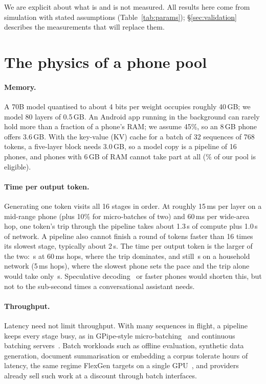 \documentclass[sigconf,nonacm]{acmart}
\begin{document}
We are explicit about what is and is not measured. All results here come from
simulation with stated assumptions (Table~\ref{tab:params}); \S\ref{sec:validation}
describes the measurements that will replace them.

\section{The physics of a phone pool}
\label{sec:physics}

\paragraph{Memory.} A 70B model quantised to about 4 bits per weight occupies
roughly 40\,GB; we model 80 layers of 0.5\,GB. An Android app running in the
background can rarely hold more than a fraction of a phone's RAM; we assume
45\%, so an 8\,GB phone offers 3.6\,GB. With the key-value (KV) cache for a
batch of 32 sequences of 768 tokens, a five-layer block needs 3.0\,GB, so a
model copy is a pipeline of 16 phones, and phones with 6\,GB of RAM cannot take
part at all (\EligiblePct\% of our pool is eligible).

\paragraph{Time per output token.} Generating one token visits all 16
stages in order. At roughly 15\,ms per layer on a mid-range phone (plus 10\%
for micro-batches of two) and 60\,ms per wide-area hop, one token's trip
through the pipeline takes about 1.3\,s of compute plus 1.0\,s of network. A
pipeline also cannot finish a round of tokens faster than 16 times its slowest
stage, typically about 2\,s. The time
per output token is the larger of the two: \LatWAN\,s at 60\,ms hops, where the
trip dominates, and still \LatLAN\,s on a household network (5\,ms hops),
where the slowest phone sets the pace and the trip alone would take only
\PassLAN\,s. Speculative decoding~\cite{specdec} or faster phones would
shorten this, but not to the sub-second times a conversational assistant
needs.

\paragraph{Throughput.} Latency need not limit throughput. With many sequences
in flight, a pipeline keeps every stage busy, as in GPipe-style
micro-batching~\cite{gpipe} and continuous batching servers~\cite{orca,vllm}.
Batch workloads such as offline evaluation, synthetic data generation,
document summarisation or embedding a corpus tolerate hours of latency,
the same regime FlexGen targets on a single GPU~\cite{flexgen}, and providers
already sell such work at a discount through batch interfaces.
\end{document}
